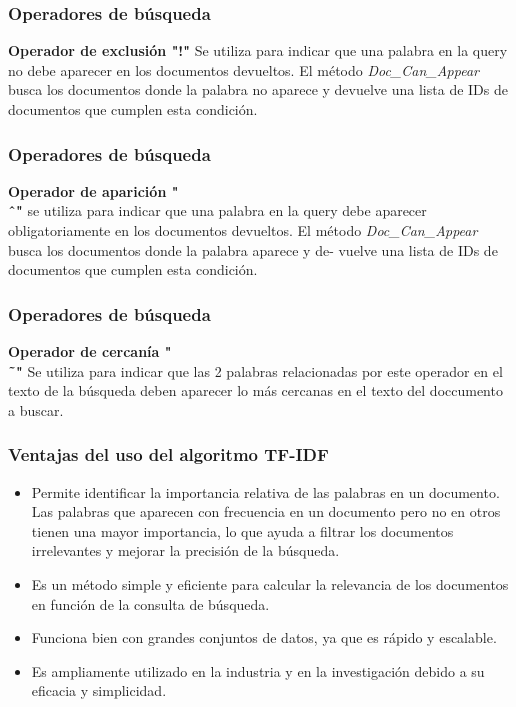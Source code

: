 \documentclass{beamer}
\begin{document}
\begin{frame}
    \frametitle{Operadores de búsqueda}
    \textbf{Operador de exclusión "!"}
    Se utiliza para indicar que una palabra en la query no
    debe aparecer en los documentos devueltos. El método \emph{Doc\_Can\_Appear}
    busca los documentos donde la palabra no aparece y devuelve una lista de
    IDs de documentos que cumplen esta condición.
\end{frame}
    
\begin{frame}
    \frametitle{Operadores de búsqueda}
    \textbf{Operador de aparición "\\ˆ"}
    se utiliza para indicar que una palabra en la query
    debe aparecer obligatoriamente en los documentos devueltos. El método
    \emph{Doc\_Can\_Appear} busca los documentos donde la palabra aparece y de-
    vuelve una lista de IDs de documentos que cumplen esta condición.
\end{frame}
    
\begin{frame}
    \frametitle{Operadores de búsqueda}
    \textbf{Operador de cercanía "\\˜"}
    Se utiliza para indicar que las 2 palabras relacionadas por este operador 
    en el texto de la búsqueda deben aparecer lo más cercanas en el texto del
    doccumento a buscar.
\end{frame}
    
\begin{frame}
    \frametitle{Ventajas del uso del algoritmo TF-IDF}
        \begin{itemize}
            \item Permite identificar la importancia relativa de las palabras en un documento. Las palabras que aparecen con frecuencia en un documento pero no en otros tienen una mayor importancia, lo que ayuda a filtrar los documentos irrelevantes y mejorar la precisión de la búsqueda.
            \item Es un método simple y eficiente para calcular la relevancia de los documentos en función de la consulta de búsqueda.
            \item Funciona bien con grandes conjuntos de datos, ya que es rápido y escalable.
            \item Es ampliamente utilizado en la industria y en la investigación debido a su eficacia y simplicidad.
        \end{itemize}
\end{frame}
    
\end{document}
